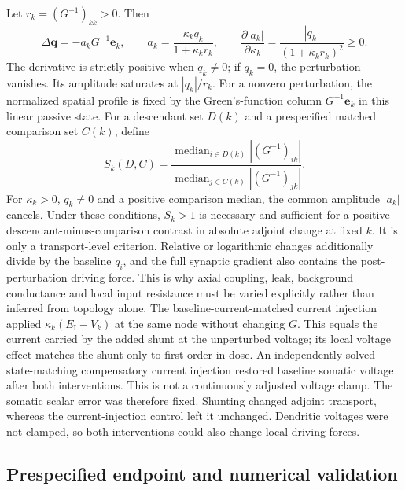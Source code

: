 Let $r_k=(G^{-1})_{kk}>0$. Then
\begin{equation}
\Delta\bm q=-a_kG^{-1}\bm e_k,
\qquad
a_k=\frac{\kappa_kq_k}{1+\kappa_kr_k},
\qquad
\frac{\partial |a_k|}{\partial\kappa_k}
=\frac{|q_k|}{(1+\kappa_kr_k)^2}\geq0.
\label{eq:s_shunt_amplitude}
\end{equation}
The derivative is strictly positive when $q_k\neq0$; if $q_k=0$, the perturbation vanishes. Its amplitude saturates at $|q_k|/r_k$. For a nonzero perturbation, the normalized spatial profile is fixed by the Green's-function column $G^{-1}\bm e_k$ in this linear passive state. For a
descendant set $D(k)$ and a prespecified matched comparison set $C(k)$, define
\begin{equation}
S_k(D,C)=
\frac{\operatorname{median}_{i\in D(k)}|(G^{-1})_{ik}|}
{\operatorname{median}_{j\in C(k)}|(G^{-1})_{jk}|}.
\label{eq:s_electrotonic_selectivity}
\end{equation}
For $\kappa_k>0$, $q_k\neq0$ and a positive comparison median, the common amplitude $|a_k|$ cancels. Under these conditions, $S_k>1$ is necessary and sufficient for a positive descendant-minus-comparison contrast in absolute adjoint change at fixed $k$. It is only a transport-level criterion. Relative
or logarithmic changes additionally divide by the baseline $q_i$, and the full
synaptic gradient also contains the post-perturbation driving force. This is
why axial coupling, leak, background conductance and local input resistance
must be varied explicitly rather than inferred from topology alone.
The baseline-current-matched current injection applied
$\kappa_k(E_{\mathrm I}-V_k)$ at the same node without changing $G$. This equals the
current carried by the added shunt at the unperturbed voltage; its local
voltage effect matches the shunt only to first order in dose. An independently
solved state-matching compensatory current injection restored baseline somatic
voltage after both interventions. This is not a continuously adjusted voltage
clamp. The somatic scalar error was therefore fixed. Shunting changed adjoint
transport, whereas the current-injection control left it unchanged. Dendritic voltages
were not clamped, so both interventions could also change local driving forces.

\subsection{Prespecified endpoint and numerical validation}

